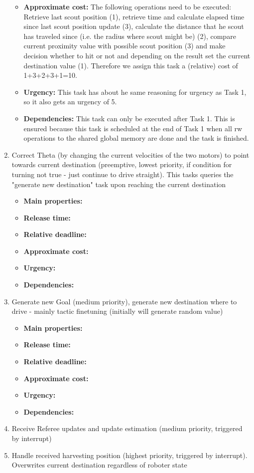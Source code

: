\documentclass[12pt]{article}
\begin{document}
\begin{enumerate}
\begin{itemize}
  	\item \textbf{Approximate cost:} The following operations need to be executed: Retrieve last scout position (1), retrieve time and calculate elapsed time since last scout position update (3), calculate the distance that he scout has traveled since (i.e. the radius where scout might be) (2), compare current proximity value with possible scout position (3) and make decision whether to hit or not and depending on the result set the current destination value (1). Therefore we assign this task a (relative) cost of 1+3+2+3+1=10. 
  	\item \textbf{Urgency:} This task has about he same reasoning for urgency as Task 1, so it also gets an urgency of 5.
  	\item \textbf{Dependencies:} This task can only be executed after Task 1. This is ensured because this task is scheduled at the end of Task 1 when all rw operations to the shared global memory are done and the task is finished.
   	\end{itemize} 	
  \item Correct Theta (by changing the current velocities of the two motors) to point towards current destination (preemptive, lowest priority, if condition for turning not true - just continue to drive straight). This tasks queries the "generate new destination" task upon reaching the current destination
  \begin{itemize}
  	\item \textbf{Main properties:}
  	\item \textbf{Release time:}
  	\item \textbf{Relative deadline:}
  	\item \textbf{Approximate cost:}
  	\item \textbf{Urgency:}
  	\item \textbf{Dependencies:}
   	\end{itemize} 	
  \item Generate new Goal (medium priority), generate new destination where to drive - mainly tactic finetuning (initially will generate random value)
  \begin{itemize}
  	\item \textbf{Main properties:}
  	\item \textbf{Release time:}
  	\item \textbf{Relative deadline:}
  	\item \textbf{Approximate cost:}
  	\item \textbf{Urgency:}
  	\item \textbf{Dependencies:}
   	\end{itemize}
  \item Receive Referee updates and update estimation (medium priority, triggered by interrupt)
  \item Handle received harvesting position (highest priority, triggered by interrupt). Overwrites current destination regardless of roboter state
\end{enumerate}
\end{document}
